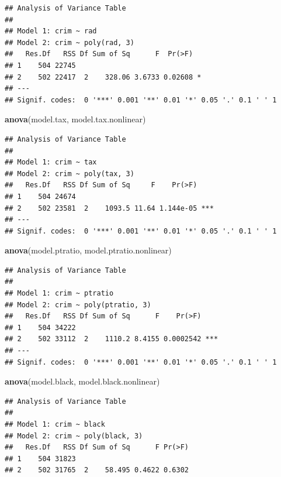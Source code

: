 \documentclass[]{article}
\newenvironment{Shaded}{\begin{snugshade}}{\end{snugshade}}
\newcommand{\KeywordTok}[1]{\textcolor[rgb]{0.13,0.29,0.53}{\textbf{#1}}}
\newcommand{\NormalTok}[1]{#1}
\begin{document}
\begin{verbatim}
## Analysis of Variance Table
## 
## Model 1: crim ~ rad
## Model 2: crim ~ poly(rad, 3)
##   Res.Df   RSS Df Sum of Sq      F  Pr(>F)  
## 1    504 22745                              
## 2    502 22417  2    328.06 3.6733 0.02608 *
## ---
## Signif. codes:  0 '***' 0.001 '**' 0.01 '*' 0.05 '.' 0.1 ' ' 1
\end{verbatim}

\begin{Shaded}
\begin{Highlighting}[]
\KeywordTok{anova}\NormalTok{(model.tax, model.tax.nonlinear)}
\end{Highlighting}
\end{Shaded}

\begin{verbatim}
## Analysis of Variance Table
## 
## Model 1: crim ~ tax
## Model 2: crim ~ poly(tax, 3)
##   Res.Df   RSS Df Sum of Sq     F    Pr(>F)    
## 1    504 24674                                 
## 2    502 23581  2    1093.5 11.64 1.144e-05 ***
## ---
## Signif. codes:  0 '***' 0.001 '**' 0.01 '*' 0.05 '.' 0.1 ' ' 1
\end{verbatim}

\begin{Shaded}
\begin{Highlighting}[]
\KeywordTok{anova}\NormalTok{(model.ptratio, model.ptratio.nonlinear)}
\end{Highlighting}
\end{Shaded}

\begin{verbatim}
## Analysis of Variance Table
## 
## Model 1: crim ~ ptratio
## Model 2: crim ~ poly(ptratio, 3)
##   Res.Df   RSS Df Sum of Sq      F    Pr(>F)    
## 1    504 34222                                  
## 2    502 33112  2    1110.2 8.4155 0.0002542 ***
## ---
## Signif. codes:  0 '***' 0.001 '**' 0.01 '*' 0.05 '.' 0.1 ' ' 1
\end{verbatim}

\begin{Shaded}
\begin{Highlighting}[]
\KeywordTok{anova}\NormalTok{(model.black, model.black.nonlinear)}
\end{Highlighting}
\end{Shaded}

\begin{verbatim}
## Analysis of Variance Table
## 
## Model 1: crim ~ black
## Model 2: crim ~ poly(black, 3)
##   Res.Df   RSS Df Sum of Sq      F Pr(>F)
## 1    504 31823                           
## 2    502 31765  2    58.495 0.4622 0.6302
\end{verbatim}
\end{document}

